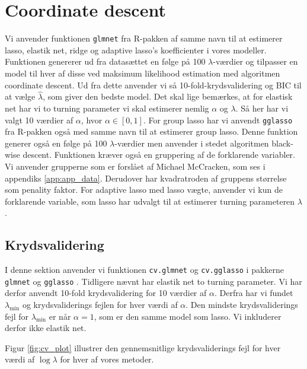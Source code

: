 \section{Coordinate descent}
Vi anvender funktionen \texttt{glmnet} fra R-pakken af samme navn til at estimerer lasso, elastik net, ridge og adaptive lasso's koefficienter i vores modeller. 
Funktionen genererer ud fra datasættet en følge på 100 $\lambda$-værdier og tilpasser en model til hver af disse ved maksimum likelihood estimation med algoritmen coordinate descent. 
Ud fra dette anvender vi så 10-fold-krydsvalidering og BIC til at vælge $\widehat{\lambda}$, som giver den bedste model. 
Det skal lige bemærkes, at for elastisk net har vi to turning parameter vi skal estimerer nemlig $\alpha$ og $\lambda$.  Så her har vi valgt 10 værdier af $\alpha$, hvor $\alpha \in [0,1]$. 
For group lasso har vi anvendt \texttt{gglasso} fra R-pakken også med samme navn til at estimerer group lasso. 
Denne funktion generer også en følge på 100 $\lambda$-værdier men anvender i stedet algoritmen black-wise descent.  Funktionen kræver også en gruppering af de forklarende variabler. 
Vi anvender grupperne som er forslået af Michael McCracken, som ses i appendiks \ref{app:app_data}. Derudover har kvadratroden af gruppens størrelse som penality faktor. 
For adaptive lasso med lasso vægte, anvender vi kun de forklarende variable, som lasso har udvalgt til at estimerer turning parameteren $\lambda$. 

\subsection{Krydsvalidering}
I denne sektion anvender vi funktionen \texttt{cv.glmnet} og \texttt{cv.gglasso} i pakkerne \texttt{glmnet} og \texttt{gglasso} . 
Tidligere nævnt har elastik net to turning parameter. 
Vi har derfor anvendt 10-fold krydsvalidering for 10 værdier af $\alpha$. 
Derfra har vi fundet $\lambda_{\min}$ og krydsvaliderings fejlen for hver værdi af $\alpha$.  
Den mindste krydsvaliderings fejl for $\lambda_{\min}$ er når $\alpha =1$, som er den samme model som lasso. 
Vi inkluderer derfor ikke elastik net.   

Figur \ref{fig:cv_plot} illustrer den gennemsnitlige krydsvaliderings fejl for hver værdi af $\log \lambda$ for hver af vores metoder.

